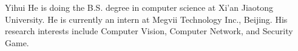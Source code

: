 \documentclass[journal]{IEEEtran}
\begin{document}
	
	\begin{IEEEbiography}[{\texttt{[image: me]}}]{Yihui He}
		is doing the B.S. degree in computer science at Xi'an Jiaotong University.
		He is currently an intern at Megvii Technology Inc., Beijing. His research interests include Computer Vision, Computer Network, and Security Game.
	\end{IEEEbiography}

	
	
	
	
	
	
\end{document}
